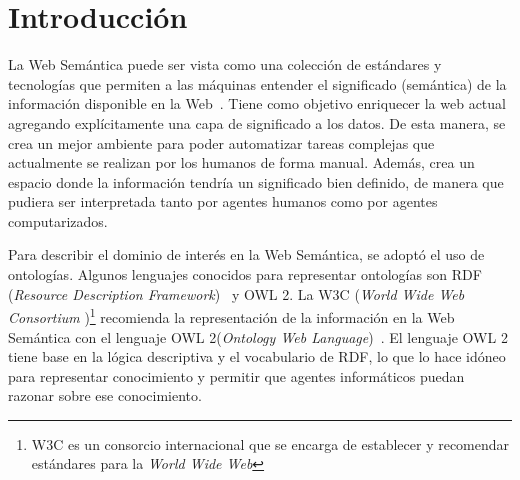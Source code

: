 \documentclass[11pt,a4paper,spanish]{book}
\begin{document}
	

\frontmatter














\tableofcontents{}

\listoffigures


\newpage

\mainmatter



\chapter{Introducción}
La Web Semántica puede ser vista como una colección de estándares y tecnologías que permiten a las máquinas entender el significado (semántica) de la información disponible en la Web~\cite{yu2011developer}. Tiene como objetivo enriquecer la web actual agregando explícitamente una capa de significado a los datos. De esta manera, se crea un mejor ambiente para poder automatizar tareas complejas que actualmente se realizan por los humanos de forma manual. Además, crea un espacio donde la información tendría un significado bien definido, de manera que pudiera ser interpretada tanto por agentes humanos como por agentes computarizados.

Para describir el dominio de interés en la Web Semántica, se adoptó el uso de ontologías. Algunos lenguajes conocidos para representar ontologías son RDF (\emph{Resource Description Framework})~\cite{RDFRecomendW3C} y OWL 2. La W3C (\emph{World Wide Web Consortium })\footnote{W3C es un consorcio internacional que se encarga de establecer y recomendar estándares para la \emph{World Wide Web}} recomienda la representación de la información en la Web Semántica con el lenguaje OWL 2(\emph{Ontology Web Language})~\cite{RecomendW3C}. El lenguaje OWL 2 tiene base en la lógica descriptiva y el vocabulario de RDF, lo que lo hace idóneo para representar conocimiento y permitir que agentes informáticos puedan razonar sobre ese conocimiento.
\end{document}
